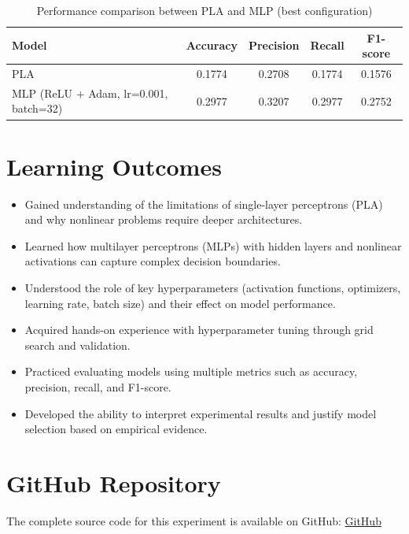 \documentclass[11pt]{article}
\begin{document}
\vspace{1cm}
\begin{table}[H]
\centering
\caption{Performance comparison between PLA and MLP (best configuration)}
\begin{tabular}{|l|c|c|c|c|}
\hline
\textbf{Model} & \textbf{Accuracy} & \textbf{Precision} & \textbf{Recall} & \textbf{F1-score} \\ \hline
PLA  & 0.1774 & 0.2708 & 0.1774 & 0.1576 \\ \hline
MLP (ReLU + Adam, lr=0.001, batch=32) & 0.2977 & 0.3207 & 0.2977 & 0.2752 \\ \hline
\end{tabular}
\end{table}

\vspace{1cm}
\section{Learning Outcomes}
\begin{itemize}
    \item Gained understanding of the limitations of single-layer perceptrons (PLA) and why nonlinear problems require deeper architectures.  
    \item Learned how multilayer perceptrons (MLPs) with hidden layers and nonlinear activations can capture complex decision boundaries.  
    \item Understood the role of key hyperparameters (activation functions, optimizers, learning rate, batch size) and their effect on model performance.  
    \item Acquired hands-on experience with hyperparameter tuning through grid search and validation.  
    \item Practiced evaluating models using multiple metrics such as accuracy, precision, recall, and F1-score.  
    \item Developed the ability to interpret experimental results and justify model selection based on empirical evidence.  
\end{itemize}

\vspace{1cm}
\section*{GitHub Repository}
The complete source code for this experiment is available on GitHub:
\href{https://github.com/yuvashreeph/Machine-Learning/tree/main/Assignment5}{GitHub}
\end{document}
